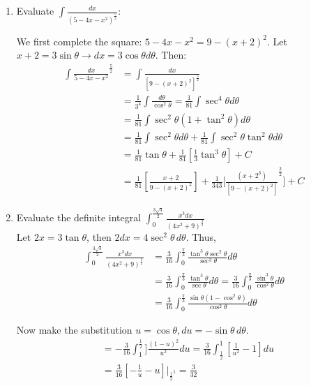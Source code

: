 \documentclass[11pt]{article}
\theoremstyle{plain}
\theoremstyle{remark}
\theoremstyle{plain}
\begin{document}
\begin{tcolorbox}[colback=magenta!5!white,colframe=magenta!75!black,title=Example ]
    \begin{enumerate} 
        \item Evaluate $\int\frac{dx}{(5-4x-x^2)^{\frac{5}{2}}}$:
        
        We first complete the square: $5-4x-x^2=9-(x+2)^2$. Let $x+2=3\sin\theta\rightarrow dx=3\cos\theta d\theta$. Then:
        \begin{align*}
            \int\frac{dx}{5-4x-x^2}^{\frac{5}{2}}&=\int\frac{dx}{[9-(x+2)^2]^{\frac{5}{2}}}\\
            &=\frac{1}{3^4}\int\frac{d\theta}{\cos^2\theta}=\frac{1}{81}\int\sec^4\theta d\theta\\
            &=\frac{1}{81}\int\sec^2\theta(1+\tan^2\theta)d\theta \\
            &=\frac{1}{81}\int\sec^2\theta d\theta +\frac{1}{81}\int\sec^2\theta \tan^2\theta d\theta\\
            &=\frac{1}{81}\tan\theta+\frac{1}{81}[\frac{1}{3}\tan^3\theta]+C\\
            &=\frac{1}{81}[\frac{x+2}{9-(x+2)^2}]+\frac{1}{343}\Big[\frac{(x+2^3)}{[9-(x+2)^2]}^{\frac{3}{2}}\Big]+C
        \end{align*}

        \item Evaluate the definite integral $\int_0^{\frac{3\sqrt{3}}{2}}\frac{x^3dx}{(4x^2+9)^{\frac{3}{2}}}$\\
        
        Let $2x=3\tan\theta$, then $2dx=4\sec^2\theta\,d\theta$. Thus,
        \begin{align*}
            \int_0^{\frac{3\sqrt{3}}{2}}\frac{x^3dx}{(4x^2+9)^{\frac{3}{2}}}&=\frac{3}{16}\int_0^{\frac{\pi}{3}}\frac{\tan^3\theta\sec^2\theta}{\sec^3\theta}d\theta\\
            &=\frac{3}{16}\int_0^{\frac{\pi}{3}}\frac{\tan^3\theta}{\sec\theta}d\theta =\frac{3}{16}\int_0^{\frac{\pi}{3}}\frac{\sin^3\theta}{\cos^2\theta}d\theta\\
            &=\frac{3}{16}\int_0^{\frac{\pi}{3}}\frac{\sin\theta(1-\cos^2\theta)}{\cos^2\theta}d\theta 
        \end{align*}

        Now make the substitution $u=\cos\theta, du=-\sin\theta\,d\theta$.
        \begin{align*}
            &=-\frac{3}{16}\int_1^{\frac{1}{2}}]\frac{(1-u)^2}{u^2}du=\frac{3}{16}\int_{\frac{1}{2}}^1[\frac{1}{u^2}-1]du\\
            &=\frac{3}{16}[-\frac{1}{u}-u]\Big|_{\frac{1}{2}^1}=\frac{3}{32}
        \end{align*}
    \end{enumerate}
\end{tcolorbox}   
\end{document}

